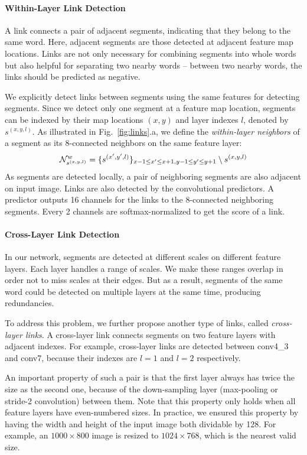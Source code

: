 \documentclass[10pt,twocolumn,letterpaper]{article}
\begin{document}
\paragraph{Within-Layer Link Detection}
A link connects a pair of adjacent segments, indicating that they belong to the same word.
Here, adjacent segments are those detected at adjacent feature map locations.
Links are not only necessary for combining segments into whole words but also helpful for separating two nearby words -- between two nearby words, the links should be predicted as negative.

We explicitly detect links between segments using the same features for detecting segments.
Since we detect only one segment at a feature map location, segments can be indexed by their map locations $(x,y)$ and layer indexes $l$, denoted by $s^{(x,y,l)}$. As illustrated in Fig.~\ref{fig:links}.a, we define the \emph{within-layer neighbors} of a segment as its 8-connected neighbors on the same feature layer:
\begin{dmath}
  {\cal N}^{w}_{s^{(x,y,l)}} = \{ s^{(x',y',l)} \}_{x-1\leq x' \leq x+1, y-1\leq y' \leq y+1} \setminus s^{(x,y,l)}
\end{dmath}
As segments are detected locally, a pair of neighboring segments are also adjacent on input image.
Links are also detected by the convolutional predictors.
A predictor outputs 16 channels for the links to the 8-connected neighboring segments.
Every 2 channels are softmax-normalized to get the score of a link.

\paragraph{Cross-Layer Link Detection}
In our network, segments are detected at different scales on different feature layers.
Each layer handles a range of scales.
We make these ranges overlap in order not to miss scales at their edges.
But as a result, segments of the same word could be detected on multiple layers at the same time, producing redundancies.

To address this problem, we further propose another type of links, called \emph{cross-layer links}.
A cross-layer link connects segments on two feature layers with adjacent indexes.
For example, cross-layer links are detected between conv4\_3 and conv7, because their indexes are $l=1$ and $l=2$ respectively.

An important property of such a pair is that the first layer always has twice the size as the second one, because of the down-sampling layer (max-pooling or stride-2 convolution) between them.
Note that this property only holds when all feature layers have even-numbered sizes.
In practice, we ensured this property by having the width and height of the input image both dividable by 128.
For example, an $1000\times 800$ image is resized to $1024 \times 768$, which is the nearest valid size.
\end{document}
